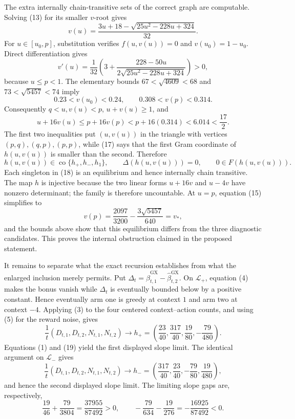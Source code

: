 The extra internally chain-transitive sets of the correct graph are computable. Solving (13) for its smaller \(v\)-root gives
\[
 v(u)=\frac{3u+18-\sqrt{25u^2-228u+324}}{32}. \tag{15}
\]
For \(u\in[u_0,p]\), substitution verifies \(f(u,v(u))=0\) and \(v(u_0)=1-u_0\). Direct differentiation gives
\[
 v'(u)=\frac1{32}\left(3+\frac{228-50u}{2\sqrt{25u^2-228u+324}}\right)>0, \tag{16}
\]
because \(u\leq p<1\). The elementary bounds \(67<\sqrt{4609}<68\) and \(73<\sqrt{5457}<74\) imply
\[
 0.23<v(u_0)<0.24,\qquad 0.308<v(p)<0.314.
\]
Consequently \(q<u,v(u)<p\), \(u+v(u)\geq1\), and
\[
 u+16v(u)\leq p+16v(p)<p+16(0.314)<6.014<\frac{17}{2}. \tag{17}
\]
The first two inequalities put \((u,v(u))\) in the triangle with vertices \((p,q),(q,p),(p,p)\), while (17) says that the first Gram coordinate of \(h(u,v(u))\) is smaller than the second. Therefore
\[
 h(u,v(u))\in\operatorname{co}\{h_+,h_-,h_1\},\qquad
 \Delta(h(u,v(u)))=0,\qquad 0\in F(h(u,v(u))). \tag{18}
\]
Each singleton in (18) is an equilibrium and hence internally chain transitive. The map \(h\) is injective because the two linear forms \(u+16v\) and \(u-4v\) have nonzero determinant; the family is therefore uncountable. At \(u=p\), equation (15) simplifies to
\[
 v(p)=\frac{2097}{3200}-\frac{3\sqrt{5457}}{640}=v_*,
\]
and the bounds above show that this equilibrium differs from the three diagnostic candidates. This proves the internal obstruction claimed in the proposed statement.

It remains to separate what the exact recursion establishes from what the enlarged inclusion merely permits. Put \(\Delta_t=\widehat\beta^{\mathrm{GX}}_{t,1}-\widehat\beta^{\mathrm{GX}}_{t,2}\). On \(\mathcal L_+\), equation (4) makes the bonus vanish while \(\Delta_t\) is eventually bounded below by a positive constant. Hence eventually arm one is greedy at context \(1\) and arm two at context \(-4\). Applying (3) to the four centered context--action counts, and using (5) for the reward noise, gives
\[
 \frac1t(D_{t,1},D_{t,2},N_{t,1},N_{t,2})
 \longrightarrow h_+=\left(\frac{23}{40},\frac{317}{40},\frac{19}{80},-\frac{79}{480}\right). \tag{19}
\]
Equations (1) and (19) yield the first displayed slope limit. The identical argument on \(\mathcal L_-\) gives
\[
 \frac1t(D_{t,1},D_{t,2},N_{t,1},N_{t,2})
 \longrightarrow h_-=\left(\frac{317}{40},\frac{23}{40},-\frac{79}{80},\frac{19}{480}\right), \tag{20}
\]
and hence the second displayed slope limit. The limiting slope gaps are, respectively,
\[
 \frac{19}{46}+\frac{79}{3804}=
 \frac{37955}{87492}>0,
 \qquad
 -\frac{79}{634}-\frac{19}{276}=-\frac{16925}{87492}<0. \tag{21}
\]

